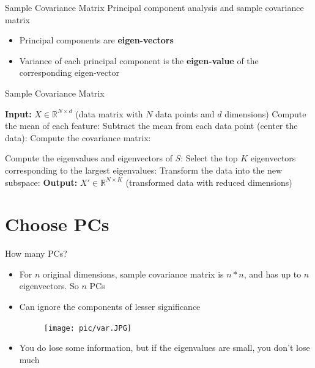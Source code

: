 \documentclass[serif, aspectratio=169]{beamer}
\begin{document}
\begin{frame}{Sample Covariance Matrix}
    Principal component analysis and sample covariance matrix
    \begin{itemize}
        \item Principal components are \textbf{eigen-vectors} 
        \item Variance of each principal component is the \textbf{eigen-value} of the corresponding eigen-vector
    \end{itemize}
\end{frame}

\begin{frame}{Sample Covariance Matrix}
    \begin{algorithm}[H]
    \caption{Sample Covariance Matrix}\label{alg:Sample Covariance Matrix}
    \begin{algorithmic}[1]
         \State \textbf{Input:} $X \in \mathbb{R}^{N \times d}$ (data matrix with $N$ data points and $d$ dimensions)
        \State Compute the mean of each feature: 
        \State Subtract the mean from each data point (center the data): 
        \State Compute the covariance matrix: 

        \State Compute the eigenvalues and eigenvectors of $S$: 
        \State Select the top $K$ eigenvectors corresponding to the largest eigenvalues: 
        \State Transform the data into the new subspace:
        \State \textbf{Output:} $X' \in \mathbb{R}^{N \times K}$ (transformed data with reduced dimensions)
    \end{algorithmic}
    \end{algorithm}
\end{frame}

\section{Choose PCs}

\begin{frame}{How many PCs?}
    \begin{itemize}
        \item For $n$ original dimensions, sample covariance matrix is $n * n$, and has up to $n$ eigenvectors. So $n$ PCs
        \item Can ignore the components of lesser significance
        \begin{figure}[htpb]
            \begin{center}
                \texttt{[image: pic/var.JPG]}
            \end{center}
        \end{figure}
        \item You do lose some information, but if the eigenvalues are small, you don’t lose much
    \end{itemize}
\end{frame}
\end{document}
